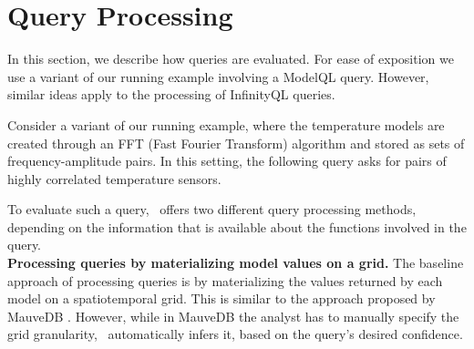 \section{Query Processing}
\label{sec:query-processing}

In this section, we describe how queries are evaluated. For ease of exposition we use a variant of our running example involving a ModelQL query. However, similar ideas apply to the processing of InfinityQL queries.

\begin{example}
\label{xmpl:correlation}
Consider a variant of our running example, where the temperature models are created through an FFT (Fast Fourier Transform) algorithm and stored as sets of frequency-amplitude pairs. In this setting, the following query asks for pairs of highly correlated temperature sensors.\\

\end{example}

To evaluate such a query, \projName\ offers two different query processing methods, depending on the information that is available about the functions involved in the query.\\ 

\textbf{Processing queries by materializing model values on a grid.}
The baseline approach of processing queries is by materializing the values returned by each model on a spatiotemporal grid. This is similar to the approach proposed by MauveDB \cite{mauvedb-grid}. However, while in MauveDB the analyst has to manually specify the grid granularity, \projName\ automatically infers it, based on the query's desired confidence.  

